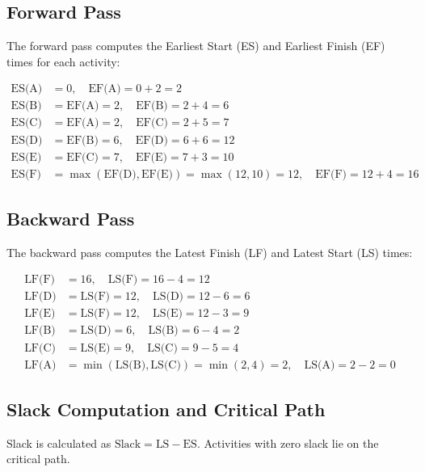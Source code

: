 \documentclass[12pt,a4paper]{article}
\begin{document}
\subsection*{Forward Pass}

The forward pass computes the Earliest Start (ES) and Earliest Finish (EF)
times for each activity:

\[
\begin{aligned}
\text{ES(A)} &= 0, \quad \text{EF(A)} = 0 + 2 = 2 \\
\text{ES(B)} &= \text{EF(A)} = 2, \quad \text{EF(B)} = 2 + 4 = 6 \\
\text{ES(C)} &= \text{EF(A)} = 2, \quad \text{EF(C)} = 2 + 5 = 7 \\
\text{ES(D)} &= \text{EF(B)} = 6, \quad \text{EF(D)} = 6 + 6 = 12 \\
\text{ES(E)} &= \text{EF(C)} = 7, \quad \text{EF(E)} = 7 + 3 = 10 \\
\text{ES(F)} &= \max(\text{EF(D)}, \text{EF(E)}) = \max(12, 10) = 12, \quad \text{EF(F)} = 12 + 4 = 16
\end{aligned}
\]

\subsection*{Backward Pass}

The backward pass computes the Latest Finish (LF) and Latest Start (LS) times:

\[
\begin{aligned}
\text{LF(F)} &= 16, \quad \text{LS(F)} = 16 - 4 = 12 \\
\text{LF(D)} &= \text{LS(F)} = 12, \quad \text{LS(D)} = 12 - 6 = 6 \\
\text{LF(E)} &= \text{LS(F)} = 12, \quad \text{LS(E)} = 12 - 3 = 9 \\
\text{LF(B)} &= \text{LS(D)} = 6, \quad \text{LS(B)} = 6 - 4 = 2 \\
\text{LF(C)} &= \text{LS(E)} = 9, \quad \text{LS(C)} = 9 - 5 = 4 \\
\text{LF(A)} &= \min(\text{LS(B)}, \text{LS(C)}) = \min(2, 4) = 2, \quad \text{LS(A)} = 2 - 2 = 0
\end{aligned}
\]

\subsection*{Slack Computation and Critical Path}

Slack is calculated as $\text{Slack} = \text{LS} - \text{ES}$. Activities with
zero slack lie on the critical path.
\end{document}
